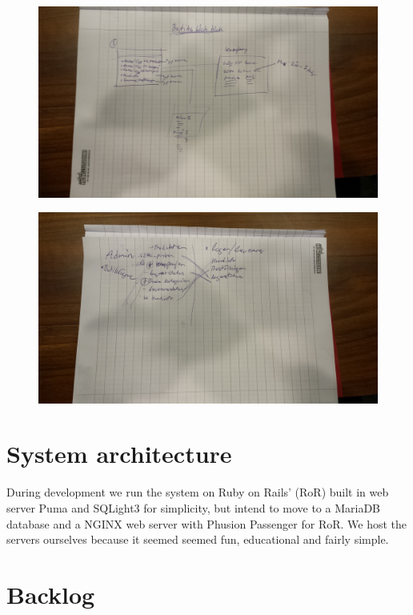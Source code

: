 \documentclass[paper=a4, fontsize=11pt]{report} %
\begin{document}
\begin{itemize}
	\begin{figure}
		\includegraphics[scale=0.12]{artifacts/ButiksAdmin.jpeg}
		\caption{}
		\label{fig:3}
	\end{figure}

	\begin{figure}
		\includegraphics[scale=0.12]{artifacts/Admin.jpeg}
		\caption{}
		\label{fig:4}
	\end{figure}

\section*{System architecture}
	During development we run the system on Ruby on Rails' (RoR) built in web server
	Puma and SQLight3 for simplicity, but intend to move to a MariaDB database
	and a NGINX web server with Phusion Passenger for RoR. We host
	the servers ourselves because it seemed seemed fun, educational and fairly simple.

\section*{Backlog}


\end{itemize}
\end{document}
